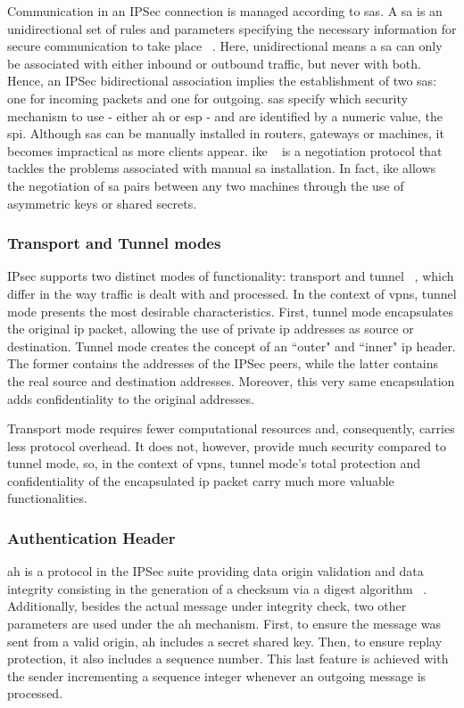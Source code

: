 \documentclass[11pt,twoside,a4paper]{report}
\begin{document}
Communication in an IPSec connection is managed according to \acp{sa}. A \ac{sa} is an unidirectional set of rules and parameters specifying the necessary information for secure communication to take place ~\cite{rfc4301}. Here, unidirectional means a \ac{sa} can only be associated with either inbound or outbound traffic, but never with both. Hence, an IPSec bidirectional association implies the establishment of two \acp{sa}: one for incoming packets and one for outgoing. \acp{sa} specify which security mechanism to use - either \ac{ah} or \ac{esp} - and are identified by a numeric value, the \ac{spi}. Although \ac{sa}s can be manually installed in routers, gateways or machines, it becomes impractical as more clients appear. \ac{ike} ~\cite{rfc7296} is a negotiation protocol that tackles the problems associated with manual \ac{sa} installation. In fact, \ac{ike} allows the negotiation of \ac{sa} pairs between any two machines through the use of asymmetric keys or shared secrets.

\subsubsection{Transport and Tunnel modes}

IPsec supports two distinct modes of functionality: transport and tunnel ~\cite{rfc4301}, which differ in the way traffic is dealt with and processed. In the context of \ac{vpn}s, tunnel mode presents the
most desirable characteristics. First, tunnel mode encapsulates the original \ac{ip} packet, allowing the use of private \ac{ip} addresses as source or destination. Tunnel mode creates the concept of an ``outer" and ``inner" \ac{ip} header. The former contains the addresses of the IPSec peers, while the latter contains the real source and destination addresses. Moreover, this very same encapsulation adds confidentiality to the original addresses.

Transport mode requires fewer computational resources and, consequently, carries less protocol overhead. It does not, however, provide much security compared to tunnel mode, so, in the context of \ac{vpn}s, tunnel mode's total protection and confidentiality of the encapsulated \ac{ip} packet carry much more valuable functionalities.

\subsubsection{Authentication Header}

\ac{ah} is a protocol in the IPSec suite providing data origin validation and data integrity consisting in the generation of a checksum via a digest algorithm ~\cite{rfc4302}. Additionally, besides the actual message under integrity check, two other parameters are used under the \ac{ah} mechanism. First, to ensure the message was sent from a valid origin, \ac{ah} includes a secret shared key. Then, to ensure replay protection, it also includes a sequence number. This last feature is achieved with the sender incrementing a sequence integer whenever an outgoing message is processed.
\end{document}
